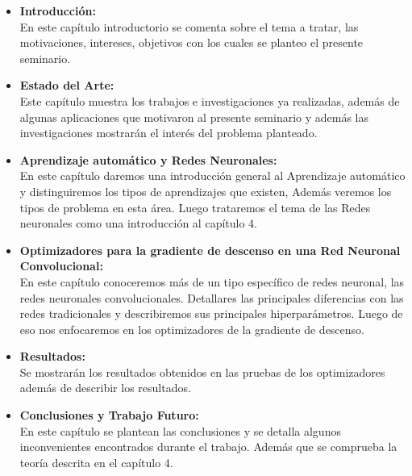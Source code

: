 \begin{itemize}

\item \textbf{Introducción:} \\
En este capítulo introductorio se comenta sobre el tema a tratar, las motivaciones, intereses, objetivos con los cuales se planteo el presente seminario.

\item \textbf{Estado del Arte:} \\
Este capítulo muestra los trabajos e investigaciones ya realizadas, además de algunas aplicaciones que motivaron al presente seminario y además las investigaciones mostrarán el interés del problema planteado.

\item \textbf{Aprendizaje automático y Redes Neuronales:} \\
En este capítulo daremos una introducción general al Aprendizaje automático y distinguiremos los tipos de aprendizajes que existen, Además veremos los tipos de problema en esta área. Luego trataremos el tema de las Redes neuronales como una introducción al capítulo 4.
\item \textbf{Optimizadores para la gradiente de descenso en una Red Neuronal Convolucional:} \\
En este capítulo conoceremos más de un tipo específico de redes neuronal, las redes neuronales convolucionales. Detallares las principales diferencias con las redes tradicionales y describiremos sus principales hiperparámetros. Luego de eso nos enfocaremos en los optimizadores de la gradiente de descenso.
\item \textbf{Resultados:} \\
Se mostrarán los resultados obtenidos en las pruebas de los optimizadores además de describir los resultados.
\item \textbf{Conclusiones y Trabajo Futuro:} \\
En este capítulo se plantean las conclusiones y se detalla algunos inconvenientes encontrados durante el trabajo. Además que se comprueba la teoría descrita en el capítulo 4.


\end{itemize}



